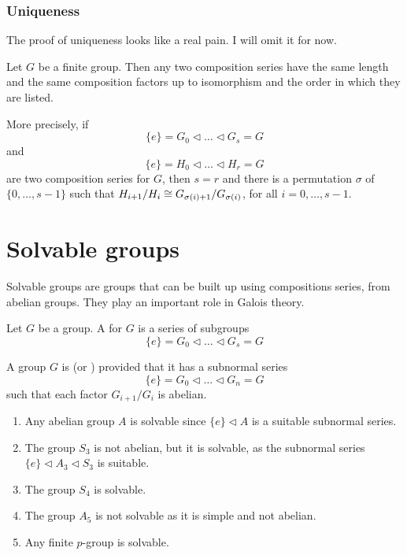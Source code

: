 \subsubsection{Uniqueness}
The proof of uniqueness looks like a real pain. I will omit it for now.
\begin{theorem}
  Let \(G\) be a finite group. Then any two composition series have the same length and the same composition factors up to isomorphism and the order in which they are listed.

  More precisely, if
  \[\{e\} = G_{0} \triangleleft \ldots \triangleleft G_{s} = G\]
  and
  \[\{e\} = H_{0} \triangleleft \ldots \triangleleft H_{r} = G\]
  are two composition series for \(G\), then \(s = r\) and there is a permutation \(\sigma\) of \(\{0, \ldots, s-1\}\) such that \(H_{i+1}/H_{i} \cong G_{\sigma(i) + 1} / G_{\sigma(i)}\), for all \(i = 0, \ldots, s-1\).
\end{theorem}



\section{Solvable groups}
Solvable groups are groups that can be built up using compositions series, from abelian groups. They play an important role in Galois theory.

\begin{definition}
  Let \(G\) be a group. A  for \(G\) is a series of subgroups
  \[\{e\} = G_{0} \triangleleft \ldots \triangleleft G_{s} = G\]
\end{definition}

\begin{definition}
  A group \(G\) is  (or ) provided that it has a subnormal series
  \[\{e\} = G_{0} \triangleleft \ldots \triangleleft G_{n} = G\]
  such that each factor \(G_{i+1} / G_{i}\) is abelian.
\end{definition}

\begin{example}
  \begin{enumerate}
  \item Any abelian group \(A\) is solvable since \(\{e\} \triangleleft A\) is a suitable subnormal series.

  \item The group \(S_{3}\) is not abelian, but it is solvable, as the subnormal series \(\{e\} \triangleleft A_{3} \triangleleft S_{3}\) is suitable.

  \item The group \(S_{4}\) is solvable.

  \item The group \(A_{5}\) is not solvable as it is simple and not abelian.

  \item Any finite \(p\)-group is solvable.
  \end{enumerate}
\end{example}


